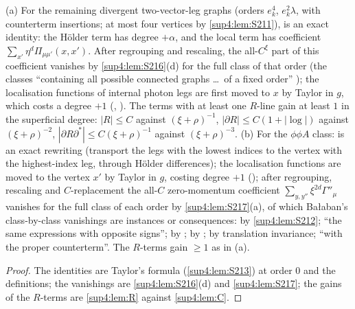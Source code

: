 \begin{lemma}[{the subtraction identities of the $D=0$ vector and $\phi\phi A$ classes, \cite[(3.31)--(3.38)]{Ba3}}]\label{sup4:lem:S2112}
\textup{(a)} For the remaining divergent two-vector-leg graphs (orders $e_k^4$, $e_k^2\lambda$, with counterterm insertions; at most four vertices by \cref{sup4:lem:S211}), \cite[(3.31)]{Ba3} is an exact identity: the H\"older term has degree $+\alpha$, and the local term has coefficient $\sum_{x'}\eta^d\Pi_{\mu\mu'}(x,x')$. After regrouping and rescaling, the all-$C^\xi$ part of this coefficient vanishes by \cref{sup4:lem:S216}(d) for the full class of that order (the classes ``containing all possible connected graphs \dots\ of a fixed order'' \cite[p.~431]{Ba3}); the localisation functions of internal photon legs are first moved to $x$ by Taylor in $g$, which costs a degree $+1$ (\cite[p.~444]{Ba3}, \cite[(3.36)]{Ba3}). The terms with at least one $R$-line gain at least $1$ in the superficial degree: $|R|\le C$ against $(\xi+\rho)^{-1}$, $|\partial R|\le C(1+|\log|)$ against $(\xi+\rho)^{-2}$, $|\partial R\partial^*|\le C(\xi+\rho)^{-1}$ against $(\xi+\rho)^{-3}$. \textup{(b)} For the $\phi\phi A$ class: \cite[(3.34)]{Ba3} is an exact rewriting (transport the legs with the lowest indices to the vertex with the highest-index leg, through H\"older differences); the localisation functions are moved to the vertex $x'$ by Taylor in $g$, costing degree $+1$ (\cite[(3.36)]{Ba3}); after regrouping, rescaling and $C$-replacement the all-$C$ zero-momentum coefficient $\sum_{y,y''}\xi^{2d}\Gamma''_\mu$ vanishes for the full class of each order by \cref{sup4:lem:S217}(a), of which Ba{\l}aban's class-by-class vanishings are instances or consequences: \cite[(2.21a)]{Ba3} by \cref{sup4:lem:S212}; \cite[(2.18)]{Ba3} ``the same expressions with opposite signs''; \cite[(2.19)]{Ba3} by \cite[(3.37)]{Ba3}; \cite[(2.20)]{Ba3} by \cite[(3.38)]{Ba3}; \cite[(2.21c)]{Ba3} by translation invariance; \cite[(2.21b), (2.21g)]{Ba3} ``with the proper counterterm''. The $R$-terms gain $\ge1$ as in (a).
\end{lemma}

\begin{proof}
The identities are Taylor's formula (\cref{sup4:lem:S213}) at order $0$ and the definitions; the vanishings are \cref{sup4:lem:S216}(d) and \cref{sup4:lem:S217}; the gains of the $R$-terms are \cref{sup4:lem:R} against \cref{sup4:lem:C}.
\end{proof}

